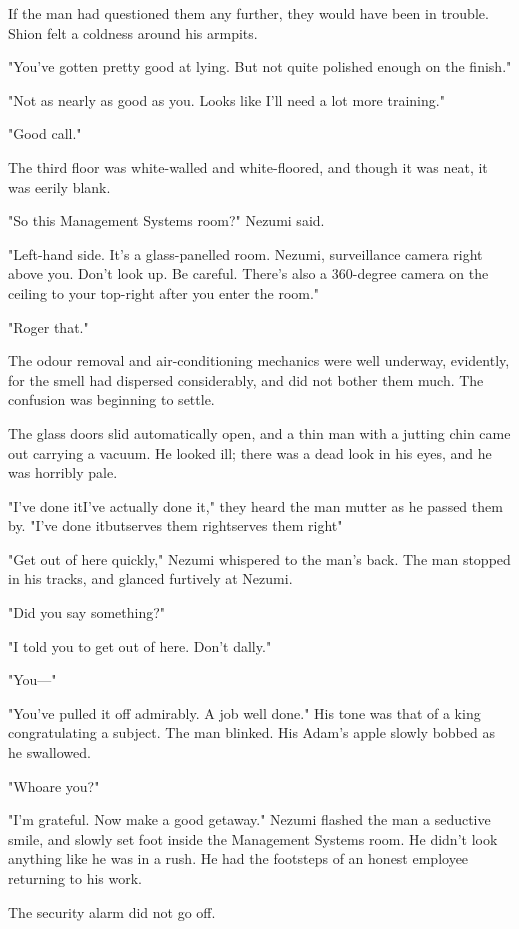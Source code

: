 If the man had questioned them any further, they would have been in
trouble. Shion felt a coldness around his armpits.

"You've gotten pretty good at lying. But not quite polished enough on
the finish."

"Not as nearly as good as you. Looks like I'll need a lot more
training."

"Good call."

The third floor was white-walled and white-floored, and though it was
neat, it was eerily blank.

"So this Management Systems room?" Nezumi said.

"Left-hand side. It's a glass-panelled room. Nezumi, surveillance camera
right above you. Don't look up. Be careful. There's also a 360-degree
camera on the ceiling to your top-right after you enter the room."

"Roger that."

The odour removal and air-conditioning mechanics were well underway,
evidently, for the smell had dispersed considerably, and did not bother
them much. The confusion was beginning to settle.

The glass doors slid automatically open, and a thin man with a jutting
chin came out carrying a vacuum. He looked ill; there was a dead look in
his eyes, and he was horribly pale.

"I've done it\el I've actually done it," they heard the man mutter as he
passed them by. "I've done it\el but\el serves them right\el serves them
right\el "

"Get out of here quickly," Nezumi whispered to the man's back. The man
stopped in his tracks, and glanced furtively at Nezumi.

"Did you say something?"

"I told you to get out of here. Don't dally."

"You---"

"You've pulled it off admirably. A job well done." His tone was that of
a king congratulating a subject. The man blinked. His Adam's apple
slowly bobbed as he swallowed.

"Who\el are you?"

"I'm grateful. Now make a good getaway." Nezumi flashed the man a
seductive smile, and slowly set foot inside the Management Systems room.
He didn't look anything like he was in a rush. He had the footsteps of
an honest employee returning to his work.

The security alarm did not go off.


